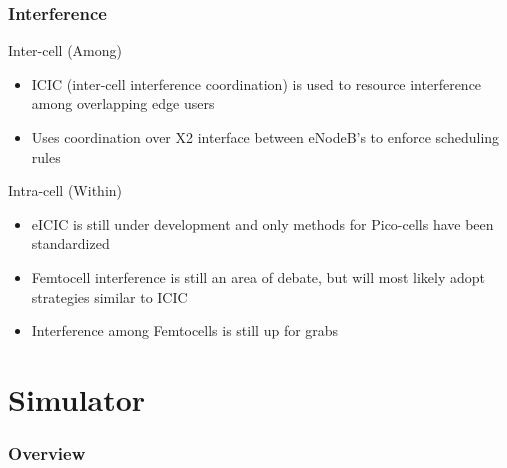\documentclass{beamer}
\begin{document}

\begin{frame}
\frametitle{Interference}

\begin{block}{Inter-cell (Among)}
\begin{itemize}
  \item ICIC (inter-cell interference coordination) is used to resource interference among overlapping edge users
  \item Uses coordination over X2 interface between eNodeB's to enforce scheduling rules
\end{itemize}
\end{block}

\begin{block}{Intra-cell (Within)}
\begin{itemize}
  \item eICIC is still under development and only methods for Pico-cells have been standardized
  \item Femtocell interference is still an area of debate, but will most likely adopt strategies similar to ICIC
  \item Interference among Femtocells is still up for grabs
\end{itemize}
\end{block}

\end{frame}

\section{Simulator}

\begin{frame}
  \frametitle{Overview} %
  \tableofcontents %
\end{frame}
\end{document}
